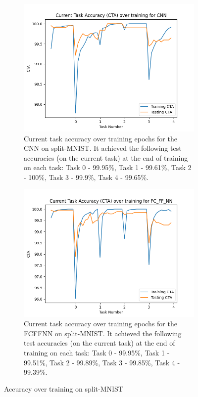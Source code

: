 \begin{figure}[htbp]
    \centering
    \begin{subfigure}[t]{0.45\linewidth}
      \centering
      \includegraphics[width=\textwidth]{images/MNIST_CL/CNN_CTA.png}
      \caption{Current task accuracy over training epochs for the CNN on split-MNIST. It achieved the following test accuracies (on the current task) at the end of training on each task: Task 0 - 99.95\%, Task 1 - 99.61\%, Task 2 - 100\%, Task 3 - 99.9\%, Task 4 - 99.65\%.}
      \label{fig:MNIST-CL-CNN-CTA}
    \end{subfigure}
    \hspace{0.5cm}
    \begin{subfigure}[t]{0.45\linewidth}
      \centering
      \includegraphics[width=\textwidth]{images/MNIST_CL/FC_FF_NN_CTA.png}
      \caption{Current task accuracy over training epochs for the FCFFNN on split-MNIST. It achieved the following test accuracies (on the current task) at the end of training on each task: Task 0 - 99.95\%, Task 1 - 99.51\%, Task 2 - 99.89\%, Task 3 - 99.85\%, Task 4 - 99.39\%.}
      \label{fig:MNIST-CL-FCFFNN-CTA}
    \end{subfigure}
    \caption{Accuracy over training on split-MNIST}
    \label{fig:MNIST-CL-CTA}
\end{figure}

